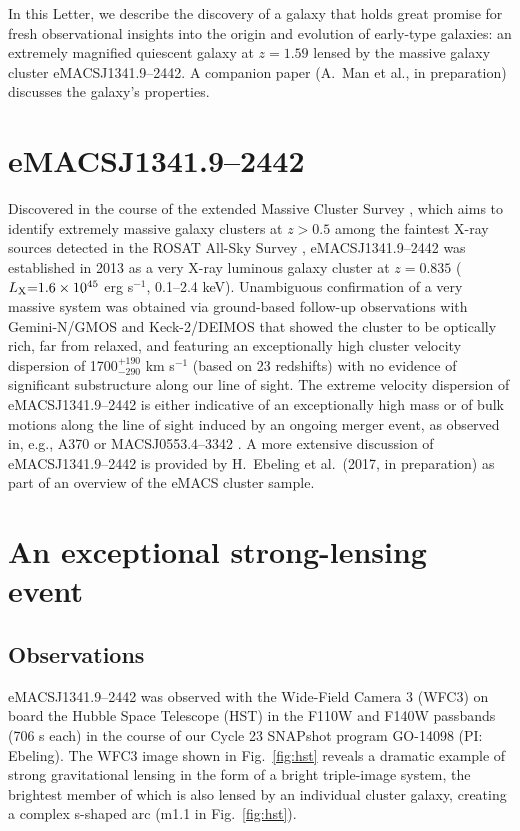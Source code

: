 \documentclass[twocolumn,times]{aastex61}
\begin{document}
In this Letter, we describe the discovery of a galaxy that holds great promise for fresh observational insights into the origin and evolution of early-type galaxies: an extremely magnified quiescent galaxy at $z=1.59$ lensed by the massive galaxy cluster eMACSJ1341.9--2442. A companion paper (A.\ Man et al., in preparation) discusses the galaxy's properties.\\

\section{eMACSJ1341.9--2442} \label{sec:e1341}

Discovered in the course of the extended Massive Cluster Survey \citep[eMACS;][]{Ebeling2013}, which aims to identify extremely massive galaxy clusters at $z{>}0.5$ among the faintest X-ray sources detected in the ROSAT All-Sky Survey \citep{Voges1999}, eMACSJ1341.9--2442 was established in 2013 as a very X-ray luminous galaxy cluster at $z{=}0.835$ ($L_{\rm X}{=}1.6\times10^{45}$ erg s$^{-1}$, 0.1--2.4 keV). Unambiguous confirmation of a very massive system was obtained via ground-based follow-up observations with Gemini-N/GMOS and Keck-2/DEIMOS that showed the cluster to be optically rich, far from relaxed, and featuring an exceptionally high cluster velocity dispersion of 1700$_{-290}^{+190}$ km s$^{-1}$ (based on 23 redshifts) with no evidence of significant substructure along our line of sight. The extreme velocity dispersion of eMACSJ1341.9--2442 is either indicative of an exceptionally high mass or of bulk motions along the line of sight induced by an ongoing merger event, as observed in, e.g., A370 \citep{Lagattuta2017} or MACSJ0553.4--3342 \citep{Ebeling2017}. A more extensive discussion of eMACSJ1341.9--2442 is provided by H.\ Ebeling et al.\ (2017, in preparation) as part of an overview of the eMACS cluster sample.  

\section{An exceptional strong-lensing event} \label{sec:hst}

\subsection{Observations}

eMACSJ1341.9--2442 was observed with the Wide-Field Camera 3 (WFC3) on board the Hubble Space Telescope (HST) in the F110W and F140W passbands (706 s each) in the course of our Cycle 23 SNAPshot program GO-14098 (PI: Ebeling). The WFC3 image shown in Fig.~\ref{fig:hst} reveals a dramatic example of strong gravitational lensing in the form of a bright triple-image system, the brightest member of which is also lensed by an individual cluster galaxy, creating a complex s-shaped arc (m1.1 in Fig.~\ref{fig:hst}). 
\end{document}
